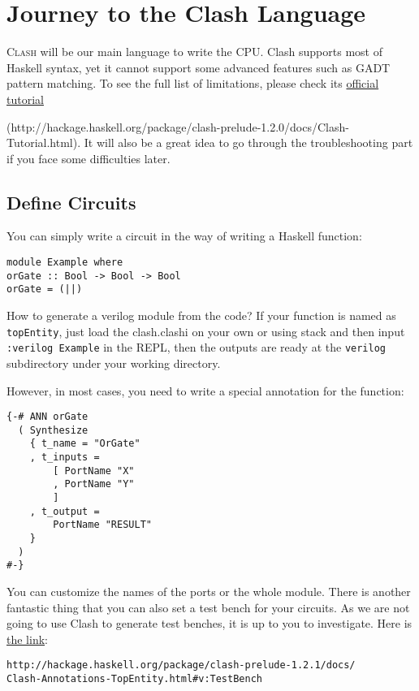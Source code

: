 \chapter{Journey to the Clash Language}
\lettrine{C}{lash} will be our main language to write the CPU. Clash supports most of Haskell syntax, yet it cannot support some advanced features such as GADT pattern matching. To see the full list of limitations, please check its \href{http://hackage.haskell.org/package/clash-prelude-1.2.0/docs/Clash-Tutorial.html}{official tutorial}

(http://hackage.haskell.org/package/clash-prelude-1.2.0/docs/Clash-Tutorial.html). It will also be a great idea to go through the troubleshooting part if you face some difficulties later.

\section{Define Circuits}
You can simply write a circuit in the way of writing a Haskell function:
\begin{verbatim}
module Example where
orGate :: Bool -> Bool -> Bool
orGate = (||)
\end{verbatim}
How to generate a verilog module from the code? If your function is named as \texttt{topEntity}, just load the clash.clashi on your own or using stack and then input \texttt{:verilog Example} in the REPL, then the outputs are ready at the \texttt{verilog} subdirectory under your working directory. 

However, in most cases, you need to write a special annotation for the function:
\begin{verbatim}
{-# ANN orGate
  ( Synthesize
    { t_name = "OrGate"
    , t_inputs = 
        [ PortName "X"
        , PortName "Y"
        ]
    , t_output = 
        PortName "RESULT" 
    }
  )
#-}
\end{verbatim}
You can customize the names of the ports or the whole module. There is another fantastic thing that you can also set a test bench for your circuits. As we are not going to use Clash to generate test benches, it is up to you to investigate. Here is \href{http://hackage.haskell.org/package/clash-prelude-1.2.1/docs/Clash-Annotations-TopEntity.html#v:TestBench}{the link}:

\begin{verbatim}
http://hackage.haskell.org/package/clash-prelude-1.2.1/docs/
Clash-Annotations-TopEntity.html#v:TestBench
\end{verbatim}

